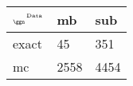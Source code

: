 \begin{tabular}{lll}
    \toprule
    $_{\text{\tiny{\ggn}}}$$^{\text{\tiny{Data}}}$ & mb & sub \\
    \midrule
    exact & 45
              & 351 \\
    mc   & 2558
              & 4454 \\
    \bottomrule
\end{tabular}
